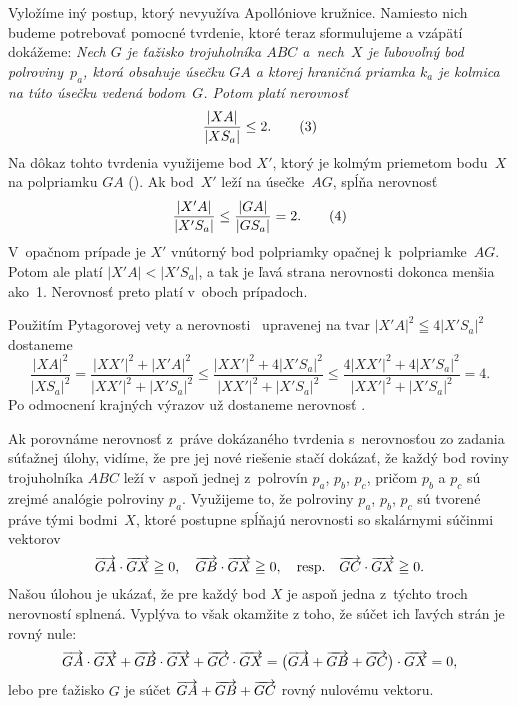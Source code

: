 {%

\ineriesenie
Vyložíme iný postup, ktorý nevyužíva
Apollóniove kružnice. Namiesto nich budeme potrebovať pomocné
tvrdenie, ktoré teraz sformulujeme a vzápätí dokážeme:
{\sl Nech $G$ je ťažisko trojuholníka $ABC$ a~nech~$X$ je ľubovoľný bod
polroviny~$p_a$, ktorá obsahuje úsečku $GA$ a
ktorej hraničná priamka $k_a$ je kolmica
na túto úsečku vedená bodom~$G$. Potom platí nerovnosť
$$
\frac{|XA|}{|XS_a|}\leq 2.
\tag3
$$
}
Na dôkaz tohto tvrdenia využijeme bod $X'$, ktorý je kolmým priemetom bodu~$X$ na
polpriamku $GA$ (\obr).
%
Ak bod~$X'$ leží na úsečke~$AG$, spĺňa nerovnosť
$$
\frac{|X'A|}{|X'S_a|}\leq\frac{|GA|}{|GS_a|}=2.
\tag4
$$
V~opačnom prípade je $X'$ vnútorný bod polpriamky opačnej
k~polpriamke~$AG$. Potom ale platí $|X'A|<|X'S_a|$, a tak je ľavá
strana nerovnosti  dokonca menšia ako~1. Nerovnosť  preto
platí v~oboch prípadoch.

Použitím Pytagorovej vety a nerovnosti~ upravenej na tvar
$|X'A|^2\leqq 4|X'S_a|^2$ dostaneme
$$
\frac{|XA|^2}{|XS_a|^2}=\frac{|XX'|^2+|X'A|^2}{|XX'|^2+|X'S_a|^2}
\leq
\frac{|XX'|^2 + 4|X'S_a|^2}{|XX'|^2 + |X'S_a|^2}\leq
\frac{4|XX'|^2 + 4|X'S_a|^2}{|XX'|^2 + |X'S_a|^2}=4.
$$
Po odmocnení krajných výrazov už dostaneme nerovnosť .

Ak porovnáme nerovnosť  z~práve dokázaného tvrdenia
s~nerovnosťou zo zadania súťažnej úlohy, vidíme, že pre jej nové
riešenie stačí dokázať, že každý bod roviny trojuholníka $ABC$ leží
v~aspoň jednej z~polrovín $p_a$, $p_b$, $p_c$, pričom $p_b$ a $p_c$
sú zrejmé analógie polroviny $p_a$. Využijeme to, že
polroviny $p_a$, $p_b$, $p_c$ sú tvorené práve tými bodmi~$X$,
ktoré postupne spĺňajú nerovnosti so skalárnymi súčinmi vektorov
$$
\overrightarrow{GA}\cdot\overrightarrow{GX}\geqq0,\quad
\overrightarrow{GB}\cdot\overrightarrow{GX}\geqq0,\quad \hbox{resp.}\quad
\overrightarrow{GC}\cdot\overrightarrow{GX}\geqq0.
$$
Našou úlohou je ukázať, že pre každý bod $X$ je aspoň jedna z~týchto troch nerovností splnená. Vyplýva to však okamžite
z toho, že súčet ich ľavých strán je rovný nule:
$$
\overrightarrow{GA}\cdot\overrightarrow{GX}+\overrightarrow{GB}\cdot\overrightarrow{GX}+\overrightarrow{GC}\cdot\overrightarrow{GX}=
\bigl(\overrightarrow{GA}+\overrightarrow{GB}+\overrightarrow{GC}\bigr)\cdot\overrightarrow{GX}=0,
$$
lebo pre ťažisko $G$ je súčet $\overrightarrow{GA}+\overrightarrow{GB}+\overrightarrow{GC}$ rovný
nulovému vektoru.

}
